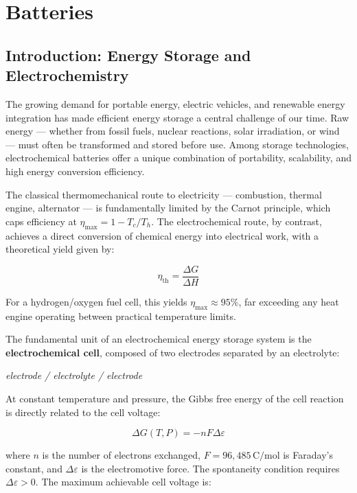 \chapter{Batteries}

\section{Introduction: Energy Storage and Electrochemistry}

The growing demand for portable energy, electric vehicles, and renewable energy integration has made efficient energy storage a central challenge of our time. Raw energy — whether from fossil fuels, nuclear reactions, solar irradiation, or wind — must often be transformed and stored before use. Among storage technologies, electrochemical batteries offer a unique combination of portability, scalability, and high energy conversion efficiency.

The classical thermomechanical route to electricity — combustion, thermal engine, alternator — is fundamentally limited by the Carnot principle, which caps efficiency at $\eta_{\max} = 1 - T_c/T_h$. The electrochemical route, by contrast, achieves a direct conversion of chemical energy into electrical work, with a theoretical yield given by:

\begin{equation}
    \eta_{\text{th}} = \frac{\Delta G}{\Delta H}
\end{equation}

For a hydrogen/oxygen fuel cell, this yields $\eta_{\max} \approx 95\%$, far exceeding any heat engine operating between practical temperature limits.

The fundamental unit of an electrochemical energy storage system is the \textbf{electrochemical cell}, composed of two electrodes separated by an electrolyte:

\begin{center}
    \textit{electrode / electrolyte / electrode}
\end{center}

At constant temperature and pressure, the Gibbs free energy of the cell reaction is directly related to the cell voltage:

\begin{equation}
    \Delta G(T,P) = -nF\Delta\varepsilon
\end{equation}

where $n$ is the number of electrons exchanged, $F = 96{,}485\,\text{C/mol}$ is Faraday's constant, and $\Delta\varepsilon$ is the electromotive force. The spontaneity condition requires $\Delta\varepsilon > 0$. The maximum achievable cell voltage is:

